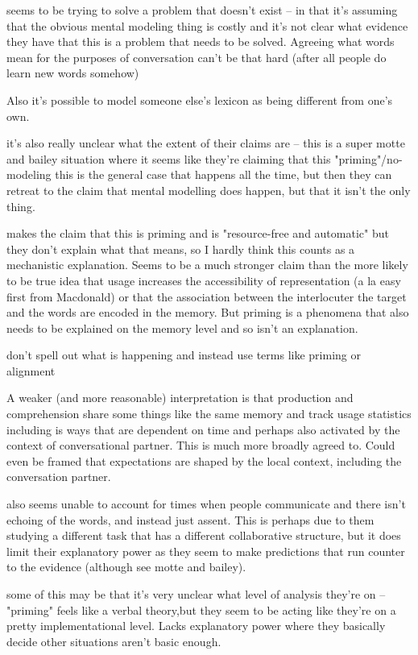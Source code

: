 \documentclass[]{article}
\begin{document}
\cite{pickering2004} seems to be trying to solve a problem that doesn't exist -- in that it's assuming that the obvious mental modeling thing is costly and it's not clear what evidence they have that this is a problem that needs to be solved. Agreeing what words mean for the purposes of conversation can't be that hard (after all people do learn new words somehow)

Also it's possible to model someone else's lexicon as being different from one's own. 

\cite{pickering} it's also really unclear what the extent of their claims are -- this is a super motte and bailey situation where it seems like they're claiming that this "priming"/no-modeling this is the general case that happens all the time, but then they can retreat to the claim that mental modelling does happen, but that it isn't the only thing. 

\cite{pickering2004} makes the claim that this is priming and is "resource-free and automatic" but they don't explain what that means, so I hardly think this counts as a mechanistic explanation. Seems to be a much stronger claim than the more likely to be true idea that usage increases the accessibility of representation (a la easy first from Macdonald) or that the association between the interlocuter the target and the words are encoded in the memory. But priming is a phenomena that also needs to be explained on the memory level and so isn't an explanation. 

\cite{pickering2004} don't spell out what is happening and instead use terms like priming or alignment 

A weaker (and more reasonable) interpretation is that production and comprehension share some things like the same memory and track usage statistics including is ways that are dependent on time and perhaps also activated by the context of conversational partner. This is much more broadly agreed to. Could even be framed that expectations are shaped by the local context, including the conversation partner. 

\cite{pickering2004} also seems unable to account for times when people communicate and there isn't echoing of the words, and instead just assent. This is perhaps due to them studying a different task that has a different collaborative structure, but it does limit their explanatory power as they seem to make predictions that run counter to the evidence (although see motte and bailey). 

\cite{pickering2004} some of this may be that it's very unclear what level of analysis they're on -- "priming" feels like a verbal theory,but they seem to be acting like they're on a pretty implementational level. Lacks explanatory power where they basically decide other situations aren't basic enough. 
\end{document}
